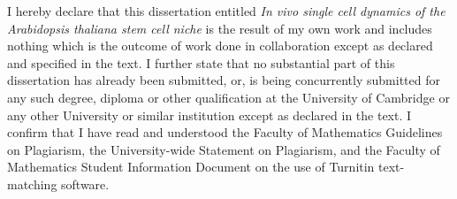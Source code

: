 
\begin{declaration}
  I hereby declare that this dissertation entitled \textit{In vivo single cell dynamics of
    the Arabidopsis thaliana stem cell niche} is the result of my own work
  and includes nothing which is the outcome of work done in collaboration except
  as declared and specified in the text. I further state that no substantial part
  of this dissertation has  
  already been submitted, or, is being concurrently submitted for any such degree,
  diploma or other  
  qualification at the University of Cambridge or any other University or similar
  institution except as  
  declared in the text. I confirm that I have read
  and understood the  
  Faculty of Mathematics Guidelines on Plagiarism, the University-wide Statement
  on Plagiarism, and  
  the Faculty of Mathematics Student Information Document on the use of Turnitin
  text-matching  
  software.



\end{declaration}

